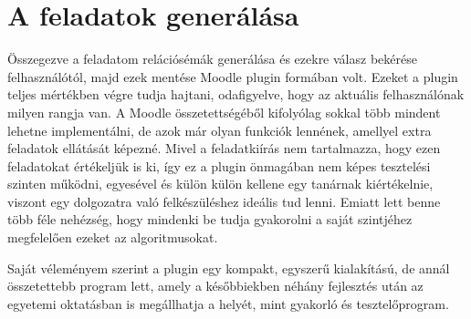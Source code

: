 \chapter{A feladatok generálása}

Összegezve a feladatom relációsémák generálása és ezekre válasz bekérése felhasználótól, majd ezek mentése Moodle plugin formában volt. Ezeket a plugin teljes mértékben végre tudja hajtani, odafigyelve, hogy az aktuális felhasználónak milyen rangja van. A Moodle összetettségéből kifolyólag sokkal több mindent lehetne implementálni, de azok már olyan funkciók lennének, amellyel extra feladatok ellátását képezné. Mivel a feladatkiírás nem tartalmazza, hogy ezen feladatokat értékeljük is ki, így ez a plugin önmagában nem képes tesztelési szinten működni, egyesével és külön külön kellene egy tanárnak kiértékelnie, viszont egy dolgozatra való felkészüléshez ideális tud lenni. Emiatt lett benne több féle nehézség, hogy mindenki be tudja gyakorolni a saját szintjéhez megfelelően ezeket az algoritmusokat. \par
Saját véleményem szerint a plugin egy kompakt, egyszerű kialakítású, de annál összetettebb program lett, amely a későbbiekben néhány fejlesztés után az egyetemi oktatásban is megállhatja a helyét, mint gyakorló és tesztelőprogram. 